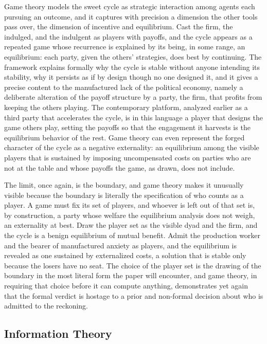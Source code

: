 Game theory models the sweet cycle as strategic interaction among agents each pursuing an outcome, and it captures with precision a dimension the other tools pass over, the dimension of incentive and equilibrium. Cast the firm, the indulged, and the indulgent as players with payoffs, and the cycle appears as a repeated game whose recurrence is explained by its being, in some range, an equilibrium: each party, given the others' strategies, does best by continuing. The framework explains formally why the cycle is stable without anyone intending its stability, why it persists as if by design though no one designed it, and it gives a precise content to the manufactured lack of the political economy, namely a deliberate alteration of the payoff structure by a party, the firm, that profits from keeping the others playing. The contemporary platform, analyzed earlier as a third party that accelerates the cycle, is in this language a player that designs the game others play, setting the payoffs so that the engagement it harvests is the equilibrium behavior of the rest. Game theory can even represent the forged character of the cycle as a negative externality: an equilibrium among the visible players that is sustained by imposing uncompensated costs on parties who are not at the table and whose payoffs the game, as drawn, does not include.

The limit, once again, is the boundary, and game theory makes it unusually visible because the boundary is literally the specification of who counts as a player. A game must fix its set of players, and whoever is left out of that set is, by construction, a party whose welfare the equilibrium analysis does not weigh, an externality at best. Draw the player set as the visible dyad and the firm, and the cycle is a benign equilibrium of mutual benefit. Admit the production worker and the bearer of manufactured anxiety as players, and the equilibrium is revealed as one sustained by externalized costs, a solution that is stable only because the losers have no seat. The choice of the player set is the drawing of the boundary in the most literal form the paper will encounter, and game theory, in requiring that choice before it can compute anything, demonstrates yet again that the formal verdict is hostage to a prior and non-formal decision about who is admitted to the reckoning.

\subsection{Information Theory}

